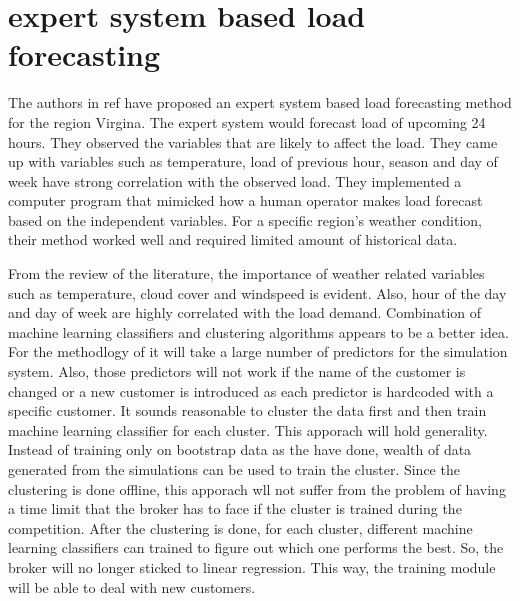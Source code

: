 \section{expert system based load forecasting}
The authors in ref \cite{rahman1988expert} have proposed an expert system based load forecasting method for the region Virgina. The expert system would forecast load of upcoming 24 hours. They observed the variables that are likely to affect the load. They came up with variables such as temperature, load of previous hour, season and day of week have strong correlation with the observed load. They implemented a computer program that mimicked how a human operator makes load forecast based on the independent variables. For a specific region's weather condition, their method worked well and required limited amount of historical data.


From the review of the literature, the importance of weather related variables such as temperature, cloud cover and windspeed is evident. Also, hour of the day and day of week are highly correlated with the load demand. Combination of machine learning classifiers and clustering algorithms appears to be a better idea. For the methodlogy of \cite{parra2013initial} it will take a large number of predictors for the simulation system. Also, those predictors will not work if the name of the customer is changed or a new customer is introduced as each predictor is hardcoded with a specific customer. It sounds reasonable to cluster the data first and then train machine learning classifier for each cluster. This apporach will hold generality. Instead of training only on bootstrap data as the \cite{wang2015gongbroker} have done, wealth of data generated from the simulations can be used to  train the cluster. Since the clustering is done offline, this apporach wll not  suffer from the problem of having a time limit that the broker has to face if the cluster is trained during the competition. After the clustering is done, for each cluster, different machine learning classifiers can trained to figure out which one performs the best. So, the broker will no longer sticked to linear regression. This way, the training module will be able to deal with new customers.

